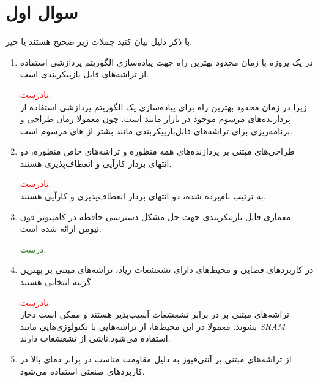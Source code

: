 \section{سوال اول}

با ذکر دلیل بیان کنید جملات زیر صحیح هستند یا خیر.

\begin{enumerate}
	\item 
	در یک پروژه با زمان محدود بهترین راه جهت پیاده‌سازی الگوریتم پردازشی استفاده از تراشه‌های قابل بازپیکربندی است.
	\begin{qsolve}
		\textcolor{red}{نادرست.}\\
		زیرا در زمان محدود بهترین راه برای پیاده‌سازی یک الگوریتم پردازشی استفاده از پردازنده‌های مرسوم موجود در بازار مانند  است. چون معمولا زمان طراحی و برنامه‌ریزی برای تراشه‌های قابل‌بازپیکربندی مانند  بشتر از  های مرسوم است.
	\end{qsolve}
	
	
	
	\item 
	طراحی‌های مبتنی بر پردازنده‌های همه منظوره و تراشه‌های خاص منظوره، دو انتهای بردار کارآیی و انعطاف‌پذیری هستند.
	\begin{qsolve}
		\textcolor{red}{نادرست.}\\
		به ترتیب نام‌برده شده، دو انتهای بردار انعطاف‌پذیری و کارآیی هستند.
	\end{qsolve}
	
	
	
	\item 
	معماری قابل بازپیکربندی جهت حل مشکل دسترسی حافظه در کامپیوتر فون نیومن ارائه شده است.
	\begin{qsolve}
		\textcolor[HTML]{347928}{درست.}\\
	\end{qsolve}
	
	
	
	\item 
	در کاربردهای فضایی و محیط‌های دارای تشعشعات زیاد، تراشه‌های مبتنی بر  بهترین گزینه انتخابی هستند.
	\begin{qsolve}
		\textcolor{red}{نادرست.}\\
		تراشه‌های مبتنی بر  در برابر تشعشعات آسیب‌پذیر هستند و ممکن است دچار  بشوند. معمولا در این محیط‌ها، از تراشه‌هایی با تکنولوژی‌هایی مانند \textit{SRAM} استفاده می‌شود.ناشی از تشعشعات دارند.
	\end{qsolve}
	
	
	
	
	\item 
	از تراشه‌های مبتنی بر آنتی‌فیوز به دلیل مقاومت مناسب در برابر دمای بالا در کاربردهای صنعتی استفاده می‌شود.
	\begin{qsolve}
		

\end{qsolve}
\end{enumerate}
